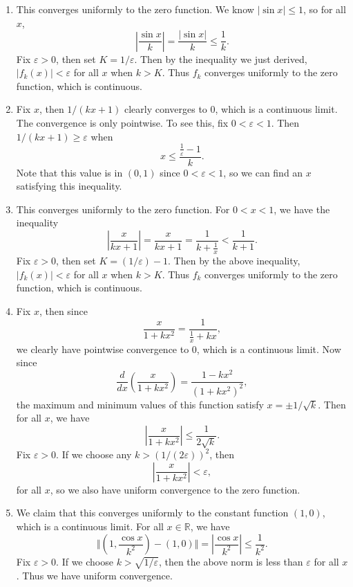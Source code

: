 \documentclass[10pt]{amsart}
\begin{document}
\begin{enumerate}
	\item This converges uniformly to the zero function. We know $|\sin x| \leq 1$, so for all $x$,
		\[
		\left| \frac{\sin x}{k}  \right| = \frac{| \sin x|}{k} \leq \frac{1}{k} .
	\] Fix $\varepsilon>0$, then set $K = 1/\varepsilon$. Then by the inequality we just derived, $|f_k(x)| < \varepsilon$ for all $x$ when $k > K$. Thus $f_k$ converges uniformly to the zero function, which is continuous.

\item Fix $x$, then $1/(kx+1)$ clearly converges to $0$, which is a continuous limit. The convergence is only pointwise. To see this, fix $0 < \varepsilon < 1$. Then $1/(kx+1) \geq \varepsilon$ when
	\[
	x \leq \frac{\frac{1}{\varepsilon} -1}{k} .
\] Note that this value is in $(0,1)$ since $0 < \varepsilon < 1$, so we can find an $x$ satisfying this inequality.

	\item This converges uniformly to the zero function. For $0<x<1$, we have the inequality
		\[
		\left| \frac{x}{kx+1}  \right|=\frac{x}{kx+1} = \frac{1}{k+\frac{1}{x} } < \frac{1}{k+1} .
	\] Fix $\varepsilon>0$, then set $K = (1/\varepsilon)-1$. Then by the above inequality, $|f_k(x)| < \varepsilon$ for all $x$ when $k > K$. Thus $f_k$ converges uniformly to the zero function, which is continuous.

	\item Fix $x$, then since
		\[
		\frac{x}{1+kx^2} = \frac{1}{\frac{1}{x} +kx} ,
		\] we clearly have pointwise convergence to 0, which is a continuous limit. Now since
		\[
			\frac{d }{d x} \left( \frac{x}{1+kx^2}  \right) = \frac{1-kx^2}{(1+kx^2)^2} ,
		\] the maximum and minimum values of this function satisfy $x = \pm 1/\sqrt{k} $. Then for all $x$, we have
		\[
		\left| \frac{x}{1+kx^2}  \right| \leq \frac{1}{2 \sqrt{k} } .
	\] Fix $\varepsilon>0$. If we choose any $k > (1/(2\varepsilon))^2$, then
	\[
	\left| \frac{x}{1+kx^2}  \right| < \varepsilon,
	\] for all $x$, so we also have uniform convergence to the zero function.

\item We claim that this converges uniformly to the constant function $(1,0)$, which is a continuous limit. For all $x \in \mathbb{R}$, we have
	\[
		\Vert{(1,\frac{\cos x}{k^2}) - (1,0)}\Vert = \left| \frac{\cos x}{k^2}  \right| \leq \frac{1}{k^2} .
	\] Fix $\varepsilon>0$. If we choose $k > \sqrt{1/\varepsilon} $, then the above norm is less than $\varepsilon$ for all $x$. Thus we have uniform convergence.
\end{enumerate}
\end{document}
